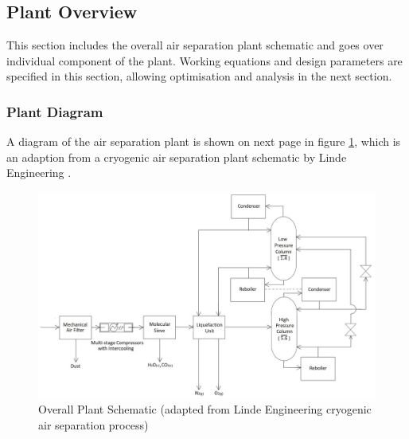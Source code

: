 \documentclass[11pt,oneside]{article}
\begin{document}
\subsection{Plant Overview} \noindent
This section includes the overall air separation plant schematic and goes over individual component of the plant. Working equations and design parameters are specified in this section, allowing optimisation and analysis in the next section.
	\subsubsection{Plant Diagram} \noindent
    A diagram of the air separation plant is shown on next page in figure \ref{plant_diagram}, which is an adaption from a cryogenic air separation plant schematic by Linde Engineering \cite{linde_cryo}.
    \begin{figure}
        \centering
	    \includegraphics[width=\linewidth]{plant_diagram.jpg}
        \caption{Overall Plant Schematic (adapted from Linde Engineering cryogenic air separation process)}
	    \label{plant_diagram}
    \end{figure}
\end{document}
